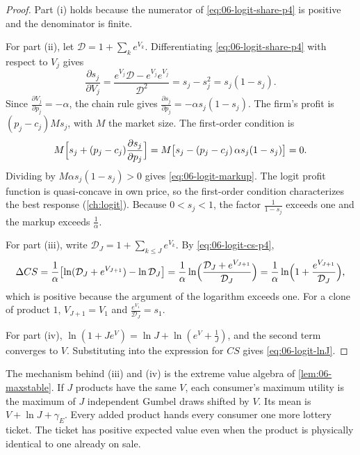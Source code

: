 \begin{proof}
Part (i) holds because the numerator of \eqref{eq:06-logit-share-p4} is positive and the denominator is finite.

For part (ii), let $\mathcal{D} = 1 + \sum_k e^{V_k}$. Differentiating \eqref{eq:06-logit-share-p4} with respect to $V_j$ gives
\begin{equation*}
  \frac{\partial s_j}{\partial V_j} = \frac{e^{V_j} \mathcal{D} - e^{V_j} e^{V_j}}{\mathcal{D}^2} = s_j - s_j^2 = s_j (1 - s_j).
\end{equation*}
Since $\frac{\partial V_j}{\partial p_j} = -\alpha$, the chain rule gives $\frac{\partial s_j}{\partial p_j} = -\alpha s_j (1
- s_j)$. The firm's profit is $(p_j - c_j) M s_j$, with $M$ the market size. The first-order condition is
\begin{equation*}
  M \Bigl[ s_j + (p_j - c_j) \frac{\partial s_j}{\partial p_j} \Bigr] = M \bigl[ s_j - (p_j - c_j)\, \alpha s_j (1 - s_j) \bigr] = 0 .
\end{equation*}
Dividing by $M \alpha s_j (1 - s_j) > 0$ gives \eqref{eq:06-logit-markup}. The logit profit function is quasi-concave
in own price, so the first-order condition characterizes the best response (\cref{ch:logit}). Because $0 < s_j < 1$,
the factor $\frac{1}{1 - s_j}$ exceeds one and the markup exceeds $\frac{1}{\alpha}$.

For part (iii), write $\mathcal{D}_J = 1 + \sum_{k \le J} e^{V_k}$. By \eqref{eq:06-logit-cs-p4},
\begin{equation*}
  \Delta CS = \frac{1}{\alpha}\bigl[\ln(\mathcal{D}_J + e^{V_{J+1}}) - \ln \mathcal{D}_J\bigr]
            = \frac{1}{\alpha}\ln\Bigl(\frac{\mathcal{D}_J + e^{V_{J+1}}}{\mathcal{D}_J}\Bigr)
            = \frac{1}{\alpha}\ln\Bigl(1 + \frac{e^{V_{J+1}}}{\mathcal{D}_J}\Bigr),
\end{equation*}
which is positive because the argument of the logarithm exceeds one. For a clone of product $1$, $V_{J+1} = V_1$ and
$\frac{e^{V_1}}{\mathcal{D}_J} = s_1$.

For part (iv), $\ln(1 + J e^{V}) = \ln J + \ln(e^{V} + \frac{1}{J})$, and the second term converges to $V$. Substituting
into the expression for $CS$ gives \eqref{eq:06-logit-lnJ}.
\end{proof}

The mechanism behind (iii) and (iv) is the extreme value algebra of \cref{lem:06-maxstable}. If $J$ products have the
same $V$, each consumer's maximum utility is the maximum of $J$ independent Gumbel draws shifted by $V$. Its mean is
$V + \ln J + \gamma_E$. Every added product hands every consumer one more lottery ticket. The ticket has positive
expected value even when the product is physically identical to one already on sale.

